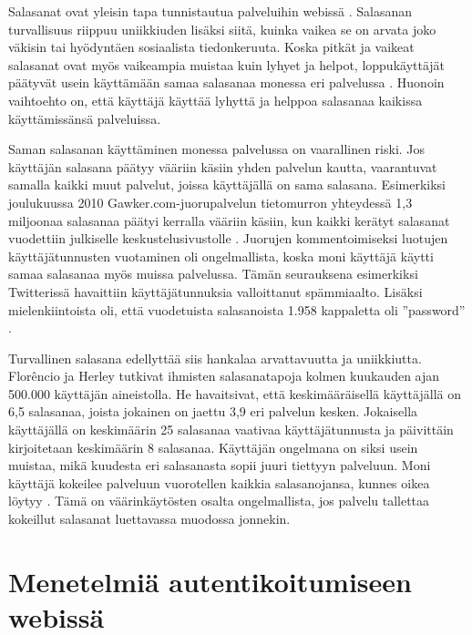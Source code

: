 \documentclass{tktltiki}
\begin{document}
Salasanat ovat yleisin tapa tunnistautua palveluihin webissä \cite{study_of_passwords_07, passpet_06, password_management_strategies_06, pwdhash_extension_05}.
Salasanan turvallisuus riippuu uniikkiuden lisäksi siitä, kuinka vaikea se on arvata joko väkisin tai hyödyntäen sosiaalista tiedonkeruuta. Koska pitkät ja vaikeat salasanat ovat myös vaikeampia muistaa kuin lyhyet ja helpot, loppukäyttäjät päätyvät usein käyttämään samaa salasanaa monessa eri palvelussa \cite{study_of_passwords_07}. Huonoin vaihtoehto on, että käyttäjä käyttää lyhyttä ja helppoa salasanaa kaikissa käyttämissänsä palveluissa.

Saman salasanan käyttäminen monessa palvelussa on vaarallinen riski. Jos käyttäjän salasana päätyy vääriin käsiin yhden palvelun kautta, vaarantuvat samalla kaikki muut palvelut, joissa käyttäjällä on sama salasana. Esimerkiksi joulukuussa 2010 Gawker.com-juorupalvelun tietomurron yhteydessä 1,3 miljoonaa salasanaa päätyi kerralla vääriin käsiin, kun kaikki kerätyt salasanat vuodettiin julkiselle keskustelusivustolle \cite{bbc_gawker_12_2010, forbes_gawker_12_2010}. Juorujen kommentoimiseksi luotujen käyttäjätunnusten vuotaminen oli ongelmallista, koska moni käyttäjä käytti samaa salasanaa myös muissa palvelussa. Tämän seurauksena esimerkiksi Twitterissä havaittiin käyttäjätunnuksia valloittanut spämmiaalto. Lisäksi mielenkiintoista oli, että vuodetuista salasanoista 1.958 kappaletta oli ''password'' \cite{forbes_gawker_12_2010}. 

Turvallinen salasana edellyttää siis hankalaa arvattavuutta ja uniikkiutta. Florêncio ja Herley \cite{study_of_passwords_07} tutkivat ihmisten salasanatapoja kolmen kuukauden ajan 500.000 käyttäjän aineistolla. He havaitsivat, että keskimääräisellä käyttäjällä on 6,5 salasanaa, joista jokainen on jaettu 3,9 eri palvelun kesken. Jokaisella käyttäjällä on keskimäärin 25 salasanaa vaativaa käyttäjätunnusta ja päivittäin kirjoitetaan keskimäärin 8 salasanaa. Käyttäjän ongelmana on siksi usein muistaa, mikä kuudesta eri salasanasta sopii juuri tiettyyn palveluun. Moni käyttäjä kokeilee palveluun vuorotellen kaikkia salasanojansa, kunnes oikea löytyy \cite{study_of_passwords_07}. Tämä on väärinkäytösten osalta ongelmallista, jos palvelu tallettaa kokeillut salasanat luettavassa muodossa jonnekin.


\section{Menetelmiä autentikoitumiseen webissä}
\end{document}
